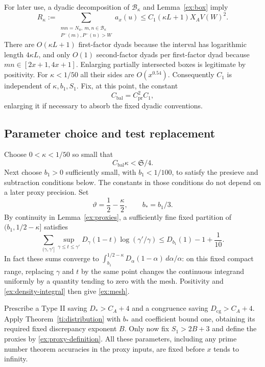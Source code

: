 For later use, a dyadic decomposition of $\mathcal B_\kappa$ and
Lemma~\ref{ex:box} imply
\begin{equation}\label{ex:all-balanced-pairs}
 R_\kappa:=
 \sum_{\substack{mn=N_u,\ m,n\in\mathcal B_\kappa\\
                  P^-(m),P^-(n)>W}}a_x(u)
 \le C_1(\kappa L+1)X_AV(W)^2.
\end{equation}
There are $O(\kappa L+1)$ first-factor dyads because the interval
has logarithmic length $4\kappa L$, and only $O(1)$ second-factor
dyads per first-factor dyad because $mn\in[2x+1,4x+1]$.
Enlarging partially intersected boxes is legitimate by positivity.
For $\kappa<1/50$ all their sides are $O(x^{0.54})$.
Consequently $C_1$ is independent of $\kappa,b_1,S_1$.
Fix, at this point, the constant
\begin{equation}\label{ex:balanced-constant}
 C_{\mathrm{bal}}=C_{\mathrm{pr}}^2C_1,
\end{equation}
enlarging it if necessary to absorb the fixed dyadic conventions.

\subsection{Parameter choice and test replacement}

Choose $0<\kappa<1/50$ so small that
\begin{equation}\label{ex:kappa-choice}
 C_{\mathrm{bal}}\kappa<\mathfrak S/4.
\end{equation}
Next choose $b_1>0$ sufficiently small, with $b_1<1/100$, to
satisfy the presieve and subtraction conditions below. The
constants in those conditions do not depend on a later proxy
precision. Set
\[
 \vartheta=\frac12-\frac\kappa2,\qquad b_* = b_1/3.
\]
By continuity in Lemma~\ref{ex:proxies}, a sufficiently fine fixed
partition of $(b_1,1/2-\kappa]$ satisfies
\begin{equation}\label{ex:mesh}
 \sum_{(\gamma,\gamma']}
    \sup_{\gamma\le t\le\gamma'}D_\gamma(1-t)
                      \log(\gamma'/\gamma)
 \le D_{b_1}(1)-1+\frac1{10}.
\end{equation}
In fact these sums converge to
$\int_{b_1}^{1/2-\kappa}D_\alpha(1-\alpha)\,d\alpha/\alpha$:
on this fixed compact range, replacing $\gamma$ and $t$ by the
same point changes the continuous integrand uniformly by a
quantity tending to zero with the mesh. Positivity and
\eqref{ex:density-integral} then give \eqref{ex:mesh}.

Prescribe a Type II saving $D_*>C_A+4$ and a congruence saving
$D_{\mathrm{cg}}>C_A+4$. Apply Theorem~\ref{ti:distribution} with
$b_*$ and coefficient bound one, obtaining its required fixed
discrepancy exponent $B$. Only now fix $S_1>2B+3$ and define the
proxies by \eqref{ex:proxy-definition}. All these parameters,
including any prime number theorem accuracies in the proxy inputs,
are fixed before $x$ tends to infinity.

